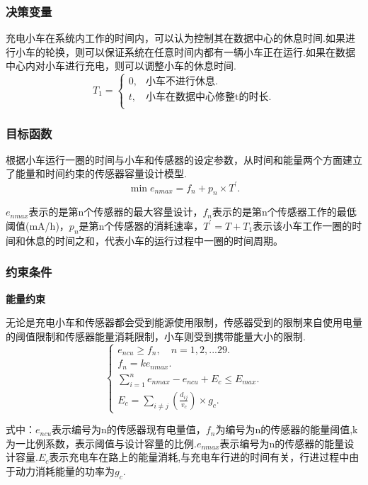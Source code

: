 \documentclass{whutmod}
\begin{document}
\subsubsection{决策变量}
充电小车在系统内工作的时间内，可以认为控制其在数据中心的休息时间.如果进行小车的轮换，则可以保证系统在任意时间内都有一辆小车正在运行.如果在数据中心内对小车进行充电，则可以调整小车的休息时间.
\begin{equation}
	T_{1}=\begin{cases} 
		0,&\text{小车不进行休息.} \\
		t,&\text{小车在数据中心修整t的时长}. \\
	\end{cases}
\end{equation}


\subsubsection{目标函数}
根据小车运行一圈的时间与小车和传感器的设定参数，从时间和能量两个方面建立了能量和时间约束的传感器容量设计模型.
\begin{equation}
	\min e_{nmax}=f_{n}+p_{n}\times T^{\prime}.
\end{equation}

$e_{nmax}$表示的是第n个传感器的最大容量设计，$f_{n}$表示的是第n个传感器工作的最低阈值(mA/h)，$p_{n}$是第n个传感器的消耗速率，$T^{\prime}=T+T_{1}$表示该小车工作一圈的时间和休息的时间之和，代表小车的运行过程中一圈的时间周期。
\subsubsection{约束条件}
\textbf{能量约束}

无论是充电小车和传感器都会受到能源使用限制，传感器受到的限制来自使用电量的阈值限制和传感器能量消耗限制，小车则受到携带能量大小的限制.
\begin{equation}
	\left\{\begin{array}{l}
		e_{ncu} \geq f_{n},\quad n=1,2,...29.\\
		f_{n}=ke_{nmax}.\\
		\sum_{i=1}^{n} e_{nmax}-e_{ncu}+E_{c} \leq E_{max}.\\
		E_{c} =\sum_{i\neq j}(\frac{d_{ij}}{v_{c}}) \times g_{c}.
	\end{array}\right.
\end{equation}

式中：$e_{ncu}$表示编号为n的传感器现有电量值，$f_{n}$为编号为n的传感器的能量阈值,k为一比例系数，表示阈值与设计容量的比例.$e_{nmax}$表示编号为n的传感器的能量设计容量.$E_{c}$表示充电车在路上的能量消耗,与充电车行进的时间有关，行进过程中由于动力消耗能量的功率为$g_{c}$.
\end{document}

